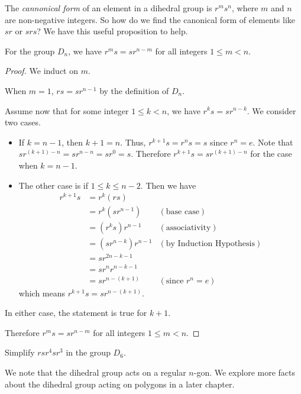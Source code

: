 The \textit{cannonical form} of an element in a dihedral group is $r^ms^n$, where $m$ and $n$ are non-negative integers. So how do we find the canonical form of elements like $sr$ or $srs$? We have this useful proposition to help.
\begin{proposition}
    For the group $D_n$, we have $r^ms = sr^{n-m}$ for all integers $1 \leq m < n$.
\end{proposition}
\begin{proof}
    We induct on $m$.
    
    When $m = 1$, $rs = sr^{n-1}$ by the definition of $D_n$.
    
    Assume now that for some integer $1 \leq k < n$, we have $r^ks = sr^{n-k}$. We consider two cases.
    \begin{itemize}
        \item If $k = n - 1$, then $k + 1 = n$. Thus, $r^{k+1}s = r^ns = s$ since $r^n = e$. Note that $sr^{(k+1)-n} = sr^{n-n} = sr^0 = s$. Therefore $r^{k+1}s = sr^{(k+1)-n}$ for the case when $k = n - 1$.
        \item The other case is if $1 \leq k \leq n - 2$. Then we have
        \begin{align*}
            r^{k+1}s &= r^k(rs)\\
            &= r^k(sr^{n-1}) & (\text{base case})\\
            &= (r^ks)r^{n-1} & (\text{associativity})\\
            &= (sr^{n-k})r^{n-1} & (\text{by Induction Hypothesis})\\
            &= sr^{2n - k - 1}\\
            &= sr^nr^{n-k-1}\\
            &= sr^{n-(k+1)} & (\text{since } r^n = e)
        \end{align*}
        which means $r^{k+1}s = sr^{n-(k+1)}$.
    \end{itemize}
    In either case, the statement is true for $k+1$.
    
    Therefore $r^ms = sr^{n-m}$ for all integers $1 \leq m < n$.
\end{proof}

\begin{exercise}
    Simplify $rsr^4sr^3$ in the group $D_6$.
\end{exercise}

We note that the dihedral group acts on a regular $n$-gon. We explore more facts about the dihedral group acting on polygons in a later chapter.

